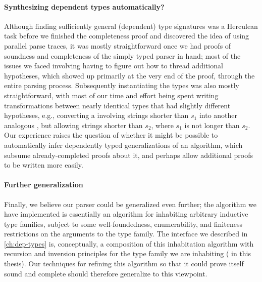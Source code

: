 
  \paragraph{Synthesizing dependent types automatically?}
    Although finding sufficiently general (dependent) type signatures was a Herculean task before we finished the completeness proof and discovered the idea of using parallel parse traces, it was mostly straightforward once we had proofs of soundness and completeness of the simply typed parser in hand; most of the issues we faced involving having to figure out how to thread additional hypotheses, which showed up primarily at the very end of the proof, through the entire parsing process.  Subsequently instantiating the types was also mostly straightforward, with most of our time and effort being spent writing transformations between nearly identical types that had slightly different hypotheses, e.g., converting a  involving strings shorter than $s_1$ into another analogous , but allowing strings shorter than $s_2$, where $s_1$ is not longer than $s_2$.  Our experience raises the question of whether it might be possible to automatically infer dependently typed generalizations of an algorithm, which subsume already-completed proofs about it, and perhaps allow additional proofs to be written more easily.

  \paragraph{Further generalization}\label{sec:generalized-inhabitation-decision}
    Finally, we believe our parser could be generalized even further; the algorithm we have implemented is essentially an algorithm for inhabiting arbitrary inductive type families, subject to some well-foundedness, enumerability, and finiteness restrictions on the arguments to the type family.  The interface we described in \autoref{ch:dep-types} is, conceptually, a composition of this inhabitation algorithm with recursion and inversion principles for the type family we are inhabiting ( in this thesis).  Our techniques for refining this algorithm so that it could prove itself sound and complete should therefore generalize to this viewpoint.
  
